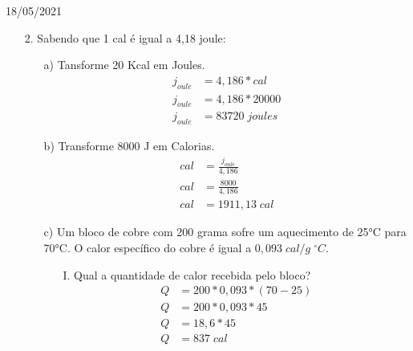 \documentclass{SchoolBook}
\begin{document}
\begin{day}{18/05/2021}
\begin{enumerate}
\begin{enumerate}
            \end{enumerate}
            
            \item[2.] Sabendo que 1 cal é igual a 4,18 joule:
            \begin{enumerate}
                \item[a)] Tansforme 20 Kcal em Joules.
                \begin{align*}
                    j_{oule} &= 4,186 * cal   \\
                    j_{oule} &= 4,186 * 20000 \\
                    j_{oule} &= 83720\;joules 
                \end{align*}
                
                \item[b)] Transforme 8000 J em Calorias.
                \begin{align*}
                    cal &= \frac{j_{oule}}{4,186} \\
                    cal &= \frac{8000}{4,186}     \\
                    cal &= 1911,13\;cal
                \end{align*}
                
                \item[c)] Um bloco de cobre com 200 grama sofre um aquecimento de 25°C para 70°C. O calor específico do cobre é igual a $ 0,093\;cal/g\;^\circ C $.
                \begin{enumerate}
                    \item[I.] Qual a quantidade de calor recebida pelo bloco?
                    \begin{align*}
                        Q &= 200 * 0,093 * (70 - 25) \\
                        Q &= 200 * 0,093 * 45        \\
                        Q &= 18,6 * 45               \\
                        Q &= 837\;cal
                    \end{align*}
                    

\end{enumerate}
\end{enumerate}
\end{enumerate}
\end{day}
\end{document}
